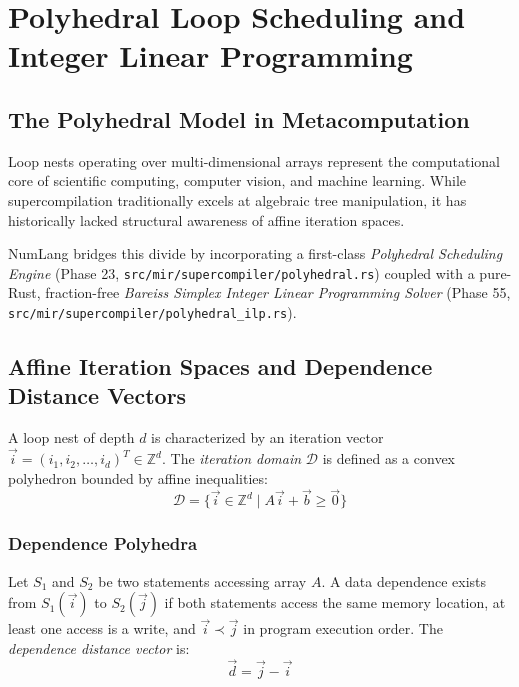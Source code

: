 \chapter{Polyhedral Loop Scheduling and Integer Linear Programming}
\label{chap:polyhedral}

\section{The Polyhedral Model in Metacomputation}
\label{sec:polyhedral:intro}

Loop nests operating over multi-dimensional arrays represent the computational core of scientific computing, computer vision, and machine learning. While supercompilation traditionally excels at algebraic tree manipulation, it has historically lacked structural awareness of affine iteration spaces.

NumLang bridges this divide by incorporating a first-class \emph{Polyhedral Scheduling Engine} (Phase 23, \texttt{src/mir/supercompiler/polyhedral.rs}) coupled with a pure-Rust, fraction-free \emph{Bareiss Simplex Integer Linear Programming Solver} (Phase 55, \texttt{src/mir/supercompiler/polyhedral\_ilp.rs}).

\section{Affine Iteration Spaces and Dependence Distance Vectors}
\label{sec:polyhedral:iteration_space}

A loop nest of depth $d$ is characterized by an iteration vector $\vec{i} = (i_1, i_2, \dots, i_d)^T \in \mathbb{Z}^d$. The \emph{iteration domain} $\mathcal{D}$ is defined as a convex polyhedron bounded by affine inequalities:
\begin{equation}
\mathcal{D} = \{ \vec{i} \in \mathbb{Z}^d \mid A \vec{i} + \vec{b} \ge \vec{0} \}
\end{equation}

\subsection{Dependence Polyhedra}
Let $S_1$ and $S_2$ be two statements accessing array $A$. A data dependence exists from $S_1(\vec{i})$ to $S_2(\vec{j})$ if both statements access the same memory location, at least one access is a write, and $\vec{i} \prec \vec{j}$ in program execution order. The \emph{dependence distance vector} is:
\begin{equation}
\vec{d} = \vec{j} - \vec{i}
\end{equation}

